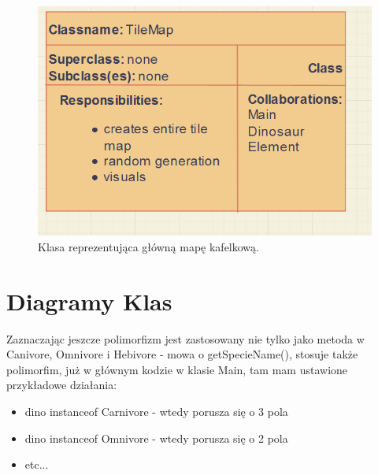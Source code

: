 \begin{figure}[h!]
    \centering
    \includegraphics[scale=0.75]{images/crc/tilemap_crc.png}
    \caption{Klasa reprezentująca główną mapę kafelkową.}
    \label{fig:my_label}
\end{figure}

\newpage

\section{Diagramy Klas}
Zaznaczając jeszcze polimorfizm jest zastosowany nie tylko jako metoda w Canivore, Omnivore i Hebivore - mowa o getSpecieName(), stosuje także polimorfim, już w głównym kodzie w klasie Main, tam mam ustawione przykładowe działania:
\begin{itemize}
    \item dino instanceof Carnivore - wtedy porusza się o 3 pola
    \item dino instanceof Omnivore - wtedy porusza się o 2 pola
    \item etc...
\end{itemize}

